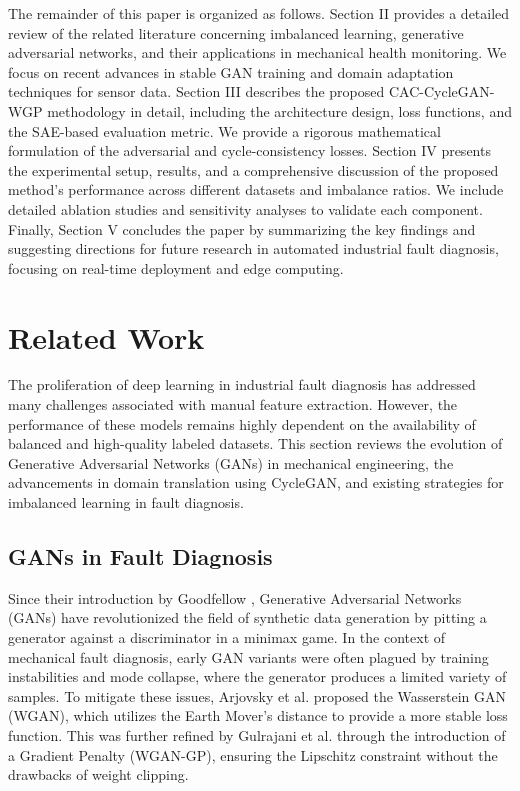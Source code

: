 \documentclass[conference,twocolumn]{IEEEtran}
\begin{document}
The remainder of this paper is organized as follows. Section II provides a detailed review of the related literature concerning imbalanced learning, generative adversarial networks, and their applications in mechanical health monitoring. We focus on recent advances in stable GAN training and domain adaptation techniques for sensor data. Section III describes the proposed CAC-CycleGAN-WGP methodology in detail, including the architecture design, loss functions, and the SAE-based evaluation metric. We provide a rigorous mathematical formulation of the adversarial and cycle-consistency losses. Section IV presents the experimental setup, results, and a comprehensive discussion of the proposed method's performance across different datasets and imbalance ratios. We include detailed ablation studies and sensitivity analyses to validate each component. Finally, Section V concludes the paper by summarizing the key findings and suggesting directions for future research in automated industrial fault diagnosis, focusing on real-time deployment and edge computing.


\section{Related Work}
\label{sec:related_work}
The proliferation of deep learning in industrial fault diagnosis has addressed many challenges associated with manual feature extraction. However, the performance of these models remains highly dependent on the availability of balanced and high-quality labeled datasets. This section reviews the evolution of Generative Adversarial Networks (GANs) in mechanical engineering, the advancements in domain translation using CycleGAN, and existing strategies for imbalanced learning in fault diagnosis.

\subsection{GANs in Fault Diagnosis}
Since their introduction by Goodfellow \cite{1}, Generative Adversarial Networks (GANs) have revolutionized the field of synthetic data generation by pitting a generator against a discriminator in a minimax game. In the context of mechanical fault diagnosis, early GAN variants were often plagued by training instabilities and mode collapse, where the generator produces a limited variety of samples. To mitigate these issues, Arjovsky et al. \cite{2} proposed the Wasserstein GAN (WGAN), which utilizes the Earth Mover's distance to provide a more stable loss function. This was further refined by Gulrajani et al. \cite{3} through the introduction of a Gradient Penalty (WGAN-GP), ensuring the Lipschitz constraint without the drawbacks of weight clipping.
\end{document}
